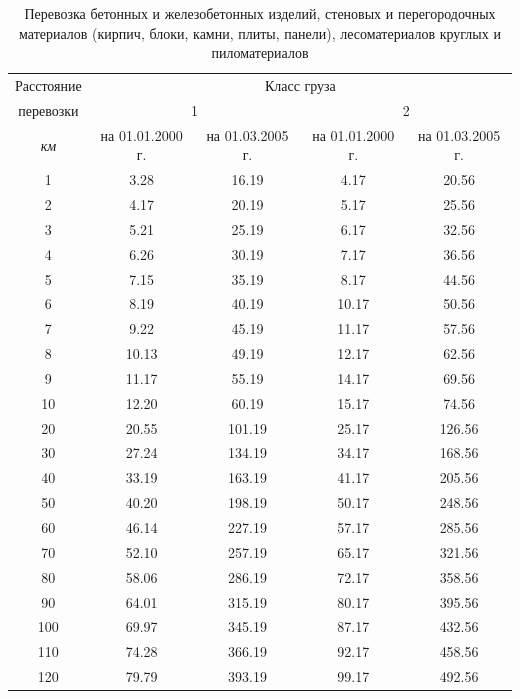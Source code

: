 \begin{longtable}[!hb]{|c|c|c|c|c|}
  \caption{
  Перевозка бетонных и железобетонных изделий, стеновых 
  и перегородочных материалов (кирпич, блоки, камни, плиты, панели), 
  лесоматериалов круглых и пиломатериалов
  } \\
  \endhead
  \hline
  \label{short}
      Расстояние & \multicolumn{4}{c|}{Класс груза} \\
                 \cline{2-5}
      перевозки  & \multicolumn{2}{c|}{1} & \multicolumn{2}{c|}{2} \\
                 \cline{2-5}
     \textit{км} & на 01.01.2000 г. & на 01.03.2005 г.
                 & на 01.01.2000 г. & на 01.03.2005 г. \\
  \hline
    1 &  3.28 &  16.19 &  4.17 &  20.56 \\ \hline
    2 &  4.17 &  20.19 &  5.17 &  25.56 \\ \hline
    3 &  5.21 &  25.19 &  6.17 &  32.56 \\ \hline
    4 &  6.26 &  30.19 &  7.17 &  36.56 \\ \hline
    5 &  7.15 &  35.19 &  8.17 &  44.56 \\ \hline
    6 &  8.19 &  40.19 & 10.17 &  50.56 \\ \hline
    7 &  9.22 &  45.19 & 11.17 &  57.56 \\ \hline
    8 & 10.13 &  49.19 & 12.17 &  62.56 \\ \hline
    9 & 11.17 &  55.19 & 14.17 &  69.56 \\ \hline
   10 & 12.20 &  60.19 & 15.17 &  74.56 \\ \hline
   20 & 20.55 & 101.19 & 25.17 & 126.56 \\ \hline
   30 & 27.24 & 134.19 & 34.17 & 168.56 \\ \hline
   40 & 33.19 & 163.19 & 41.17 & 205.56 \\ \hline
   50 & 40.20 & 198.19 & 50.17 & 248.56 \\ \hline
   60 & 46.14 & 227.19 & 57.17 & 285.56 \\ \hline
   70 & 52.10 & 257.19 & 65.17 & 321.56 \\ \hline
   80 & 58.06 & 286.19 & 72.17 & 358.56 \\ \hline
   90 & 64.01 & 315.19 & 80.17 & 395.56 \\ \hline
  100 & 69.97 & 345.19 & 87.17 & 432.56 \\ \hline
  110 & 74.28 & 366.19 & 92.17 & 458.56 \\ \hline
  120 & 79.79 & 393.19 & 99.17 & 492.56 \\ \hline
\end{longtable}

